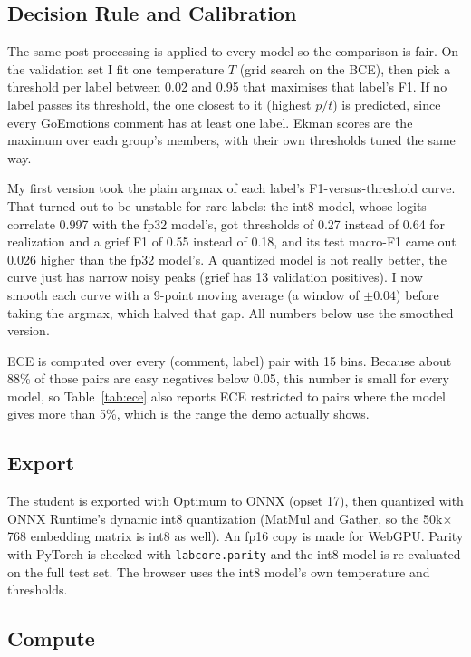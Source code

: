\documentclass[11pt,a4paper]{article}
\begin{document}
\subsection{Decision Rule and Calibration}
\label{sec:thr}

The same post-processing is applied to every model so the comparison is fair. On the validation set I fit one
temperature $T$ (grid search on the BCE), then pick a threshold per label between 0.02 and 0.95 that maximises
that label's F1. If no label passes its threshold, the one closest to it (highest $p/t$) is predicted, since
every GoEmotions comment has at least one label. Ekman scores are the maximum over each group's members, with
their own thresholds tuned the same way.

My first version took the plain argmax of each label's F1-versus-threshold curve. That turned out to be
unstable for rare labels: the int8 model, whose logits correlate 0.997 with the fp32 model's, got thresholds
of 0.27 instead of 0.64 for realization and a grief F1 of 0.55 instead of 0.18, and its test macro-F1 came out
0.026 higher than the fp32 model's. A quantized model is not really better, the curve just has narrow noisy
peaks (grief has 13 validation positives). I now smooth each curve with a 9-point moving average (a window of
$\pm0.04$) before taking the argmax, which halved that gap. All numbers below use the smoothed version.

ECE is computed over every (comment, label) pair with 15 bins. Because about 88\% of those pairs are easy
negatives below 0.05, this number is small for every model, so Table~\ref{tab:ece} also reports ECE restricted
to pairs where the model gives more than 5\%, which is the range the demo actually shows.

\subsection{Export}

The student is exported with Optimum \cite{optimum} to ONNX (opset 17), then quantized with ONNX Runtime's
dynamic int8 quantization (MatMul and Gather, so the 50k$\times$768 embedding matrix is int8 as well). An fp16
copy is made for WebGPU. Parity with PyTorch is checked with \texttt{labcore.parity} and the int8 model is
re-evaluated on the full test set. The browser uses the int8 model's own temperature and thresholds.

\subsection{Compute}
\end{document}
